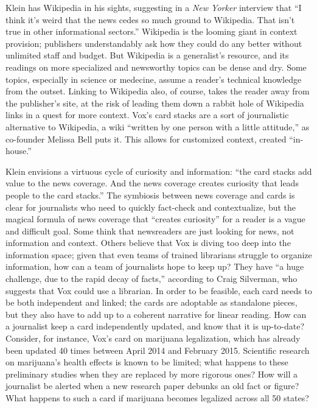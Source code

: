 Klein has Wikipedia in his sights, suggesting in a \emph{New Yorker} interview that ``I think it's weird that the news cedes so much ground to Wikipedia. That isn't true in other informational sectors.''\autocite{coscarelli_ezra_2014} Wikipedia is the looming giant in context provision; publishers understandably ask how they could do any better without unlimited staff and budget. But Wikipedia is a generalist's resource, and its readings on more specialized and newsworthy topics can be dense and dry. Some topics, especially in science or medecine, assume a reader's technical knowledge from the outset. Linking to Wikipedia also, of course, takes the reader away from the publisher's site, at the risk of leading them down a rabbit hole of Wikipedia links in a quest for more context. Vox's card stacks are a sort of journalistic alternative to Wikipedia, a wiki ``written by one person with a little attitude,'' as co-founder Melissa Bell puts it.\autocite{kaufman_vox_2014} This allows for customized context, created ``in-house.''

Klein envisions a virtuous cycle of curiosity and information: ``the card stacks add value to the news coverage. And the news coverage creates curiosity that leads people to the card stacks.''\autocite{coscarelli_ezra_2014} The symbiosis between news coverage and cards is clear for journalists who need to quickly fact-check and contextualize, but the magical formula of news coverage that ``creates curiosity'' for a reader is a vague and difficult goal. Some think that newsreaders are just looking for news, not information and context. Others believe that Vox is diving too deep into the information space; given that even teams of trained librarians struggle to organize information, how can a team of journalists hope to keep up? They have ``a huge challenge, due to the rapid decay of facts,'' according to Craig Silverman, who suggests that Vox could use a librarian.\autocite{silverman_why_2014} In order to be feasible, each card needs to be both independent and linked; the cards are adoptable as standalone pieces, but they also have to add up to a coherent narrative for linear reading. How can a journalist keep a card independently updated, and know that it is up-to-date? Consider, for instance, Vox's card on marijuana legalization, which has already been updated 40 times between April 2014 and February 2015.\autocite{lopez_everything_????} Scientific research on marijuana's health effects is known to be limited; what happens to these preliminary studies when they are replaced by more rigorous ones? How will a journalist be alerted when a new research paper debunks an old fact or figure? What happens to such a card if marijuana becomes legalized across all 50 states?

